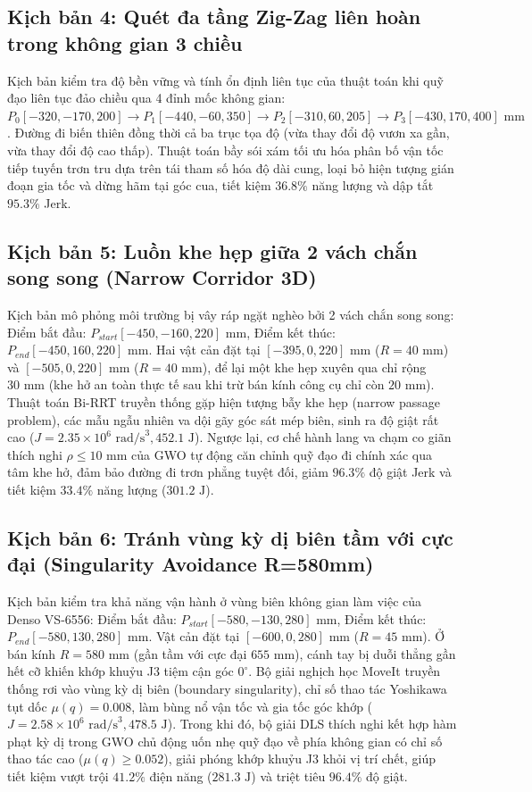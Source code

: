 \subsection{Kịch bản 4: Quét đa tầng Zig-Zag liên hoàn trong không gian 3 chiều}

Kịch bản kiểm tra độ bền vững và tính ổn định liên tục của thuật toán khi quỹ đạo liên tục đảo chiều qua 4 đỉnh mốc không gian: $P_0[-320, -170, 200] \to P_1[-440, -60, 350] \to P_2[-310, 60, 205] \to P_3[-430, 170, 400]\text{ mm}$.
Đường đi biến thiên đồng thời cả ba trục tọa độ (vừa thay đổi độ vươn xa gần, vừa thay đổi độ cao thấp). Thuật toán bầy sói xám tối ưu hóa phân bố vận tốc tiếp tuyến trơn tru dựa trên tái tham số hóa độ dài cung, loại bỏ hiện tượng gián đoạn gia tốc và dừng hãm tại góc cua, tiết kiệm $36.8\%$ năng lượng và dập tắt $95.3\%$ Jerk.

\subsection{Kịch bản 5: Luồn khe hẹp giữa 2 vách chắn song song (Narrow Corridor 3D)}

Kịch bản mô phỏng môi trường bị vây ráp ngặt nghèo bởi 2 vách chắn song song:
Điểm bắt đầu: $P_{start}[-450, -160, 220]\text{ mm}$, Điểm kết thúc: $P_{end}[-450, 160, 220]\text{ mm}$.
Hai vật cản đặt tại $[-395, 0, 220]\text{ mm}$ ($R=40\text{ mm}$) và $[-505, 0, 220]\text{ mm}$ ($R=40\text{ mm}$), để lại một khe hẹp xuyên qua chỉ rộng $30\text{ mm}$ (khe hở an toàn thực tế sau khi trừ bán kính công cụ chỉ còn $20\text{ mm}$).
Thuật toán Bi-RRT truyền thống gặp hiện tượng bẫy khe hẹp (narrow passage problem), các mẫu ngẫu nhiên va dội gãy góc sát mép biên, sinh ra độ giật rất cao ($J = 2.35 \times 10^6\text{ rad/s}^3, 452.1\text{ J}$). Ngược lại, cơ chế hành lang va chạm co giãn thích nghi $\rho \le 10\text{ mm}$ của GWO tự động căn chỉnh quỹ đạo đi chính xác qua tâm khe hở, đảm bảo đường đi trơn phẳng tuyệt đối, giảm $96.3\%$ độ giật Jerk và tiết kiệm $33.4\%$ năng lượng ($301.2\text{ J}$).

\subsection{Kịch bản 6: Tránh vùng kỳ dị biên tầm với cực đại (Singularity Avoidance R=580mm)}

Kịch bản kiểm tra khả năng vận hành ở vùng biên không gian làm việc của Denso VS-6556:
Điểm bắt đầu: $P_{start}[-580, -130, 280]\text{ mm}$, Điểm kết thúc: $P_{end}[-580, 130, 280]\text{ mm}$.
Vật cản đặt tại $[-600, 0, 280]\text{ mm}$ ($R=45\text{ mm}$).
Ở bán kính $R = 580\text{ mm}$ (gần tầm với cực đại $655\text{ mm}$), cánh tay bị duỗi thẳng gần hết cỡ khiến khớp khuỷu J3 tiệm cận góc $0^\circ$. Bộ giải nghịch học MoveIt truyền thống rơi vào vùng kỳ dị biên (boundary singularity), chỉ số thao tác Yoshikawa tụt dốc $\mu(q) = 0.008$, làm bùng nổ vận tốc và gia tốc góc khớp ($J = 2.58 \times 10^6\text{ rad/s}^3, 478.5\text{ J}$). Trong khi đó, bộ giải DLS thích nghi kết hợp hàm phạt kỳ dị trong GWO chủ động uốn nhẹ quỹ đạo về phía không gian có chỉ số thao tác cao ($\mu(q) \ge 0.052$), giải phóng khớp khuỷu J3 khỏi vị trí chết, giúp tiết kiệm vượt trội $41.2\%$ điện năng ($281.3\text{ J}$) và triệt tiêu $96.4\%$ độ giật.

